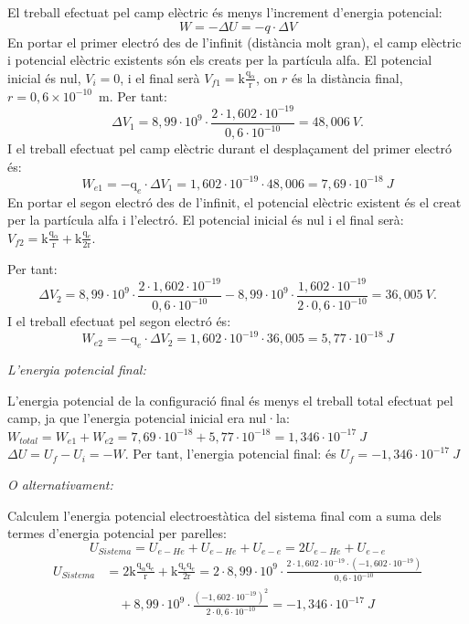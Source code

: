 \begin{solapartat}
 El treball efectuat pel camp elèctric és menys l'increment d'energia potencial:
\[ W = -\Delta U = -q\cdot\Delta V \]
 En portar el primer electró des de l'infinit (distància molt gran), el camp elèctric i potencial elèctric existents són els creats per la partícula alfa. El potencial inicial és nul, $V_i = 0$, i el final serà $V_{f1} = \mathrm{k}\frac{\mathrm{q}_\alpha}{\mathrm{r}}$, on $r$ és la distància final, $r = 0,6\times 10^{-10}$~m. Per tant:
\[ \Delta V_1 = 8,99\cdot 10^{9}\cdot\frac{2\cdot 1,602\cdot 10^{-19}}{0,6\cdot 10^{-10}} = 48,006\ V. \]
I el treball efectuat pel camp elèctric durant el desplaçament del primer electró és:
\[ W_{e1} = -\mathrm{q}_e\cdot\Delta V_1 = 1,602\cdot 10^{-19}\cdot 48,006 = 7,69\cdot 10^{-18}\ J \]
 En portar el segon electró des de l'infinit, el potencial elèctric existent és el creat per la partícula alfa i l'electró. El potencial inicial és nul i el final serà: $V_{f2} = \mathrm{k}\frac{\mathrm{q}_\alpha}{\mathrm{r}} + \mathrm{k}\frac{\mathrm{q}_e}{2\mathrm{r}}$.

Per tant:
\[ \Delta V_2 = 8,99\cdot 10^{9}\cdot\frac{2\cdot 1,602\cdot 10^{-19}}{0,6\cdot 10^{-10}} - 8,99\cdot 10^{9}\cdot\frac{1,602\cdot 10^{-19}}{2\cdot 0,6\cdot 10^{-10}} = 36,005\ V. \]
I el treball efectuat pel segon electró és:
\[ W_{e2} = -\mathrm{q}_e\cdot\Delta V_2 = 1,602\cdot 10^{-19}\cdot 36,005 = 5,77\cdot 10^{-18}\ J \]

\textit{L'energia potencial final:}

 L'energia potencial de la configuració final és menys el treball total efectuat pel camp, ja que l'energia potencial inicial era nul·la:\\
$W_{total} = W_{e1} + W_{e2} = 7,69\cdot 10^{-18} + 5,77\cdot 10^{-18} = 1,346\cdot 10^{-17}\ J$\\
$\Delta U = U_f - U_i = -W$. Per tant, l'energia potencial final: és $U_f = -1,346\cdot 10^{-17}\ J$

\textit{O alternativament:}

 Calculem l'energia potencial electroestàtica del sistema final com a suma dels termes d'energia potencial per parelles:
\[ U_{Sistema} = U_{e-He} + U_{e-He} + U_{e-e} = 2U_{e-He} + U_{e-e} \]
\begin{align*}
U_{Sistema} &= 2\mathrm{k}\frac{\mathrm{q}_\alpha\mathrm{q}_e}{\mathrm{r}} + \mathrm{k}\frac{\mathrm{q}_e\mathrm{q}_e}{2\mathrm{r}} = 2\cdot 8,99\cdot 10^{9}\cdot\frac{2\cdot 1,602\cdot 10^{-19}\cdot(-1,602\cdot 10^{-19})}{0,6\cdot 10^{-10}}\\
&\quad + 8,99\cdot 10^{9}\cdot\frac{(-1,602\cdot 10^{-19})^2}{2\cdot 0,6\cdot 10^{-10}} = -1,346\cdot 10^{-17}\ J
\end{align*}
\end{solapartat}
